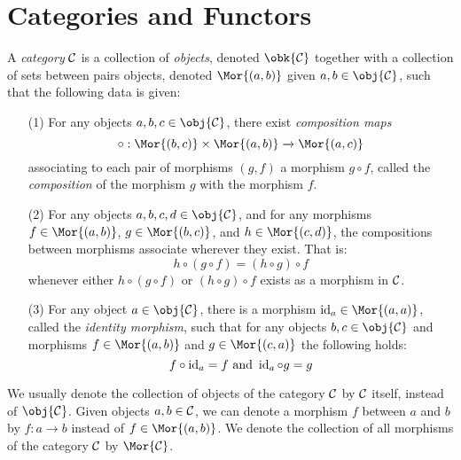 \section{Categories and Functors}\label{section_1.1}

\begin{definition}
  A \textit{category} $\mathcal{C}$ is a collection of \textit{objects},
  denoted $\obk{\Cc}$ together with a collection of sets
  between pairs objects, denoted $\Mor{(a,b)}$ given $a,b \in
  \obj{\Cc}$, such that the following data is given:
  \begin{enumerate}
    \item[(1)] For any objects $a,b,c \in \obj{\Cc}$, there exist
      \textit{composition maps}
      \begin{equation*}
        \circ:\Mor{(b,c)} \times \Mor{(a,b)} \xrightarrow{} \Mor{(a,c)}
      \end{equation*}
      associating to each pair of
      morphisms $(g,f)$ a morphism $g \circ f$, called the
      \textit{composition} of the morphism $g$ with the morphism $f$.

    \item[(2)] For any objects $a,b,c,d \in \obj{\Cc}$, and for any
      morphisms $f \in \Mor{(a,b)}$, $g \in \Mor{(b,c)}$, and $h \in
      \Mor{(c,d)}$, the compositions between morphisms associate
      wherever they exist. That is:
      \begin{equation*}
        h \circ (g \circ f)=(h \circ g) \circ f
      \end{equation*}
      whenever either $h \circ (g \circ f)$ or $(h \circ g) \circ f$
      exists as a morphism in $\mathcal{C}$.

    \item[(3)] For any object $a \in \obj{\Cc}$, there is a morphism
      $\id_a \in \Mor{(a,a)}$, called the \textit{identity morphism},
      such that for any objects $b,c \in \obj{\Cc}$ and morphisms $f
      \in \Mor{(a,b)}$ and $g \in \Mor{(c,a)}$ the following holds:
      \begin{equation*}
        f \circ \operatorname{id}_a=f \text{ and } \operatorname{id}_a \circ g=g
      \end{equation*}
  \end{enumerate}
  We usually denote the collection of objects of the category
  $\mathcal{C}$ by $\mathcal{C}$ itself, instead of $\obj{\Cc}$. Given objects
  $a,b \in \mathcal{C}$, we can denote a morphism $f$ between $a$ and $b$
  by $f:a \xrightarrow{} b$ instead of $f \in \Mor{(a,b)}$. We
  denote the collection of all morphisms of the category $\mathcal{C}$ by
  $\Mor{\Cc}$.
\end{definition}

